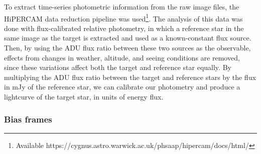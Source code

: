 To extract time-series photometric information from the raw image files, the HiPERCAM data reduction pipeline was used\footnote{Available https://cygnus.astro.warwick.ac.uk/phsaap/hipercam/docs/html/}. 
The analysis of this data was done with flux-calibrated relative photometry, in which a reference star in the same image as the target is extracted and used as a known-constant flux source. Then, by using the ADU flux ratio between these two sources as the observable, effects from changes in weather, altitude, and seeing conditions are removed, since these variations affect both the target and reference star equally. By multiplying the ADU flux ratio between the target and reference stars by the flux in mJy of the reference star, we can calibrate our photometry and produce a lightcurve of the target star, in units of energy flux.


\subsubsection{Bias frames}
\label{sect:observations:bias frames}

